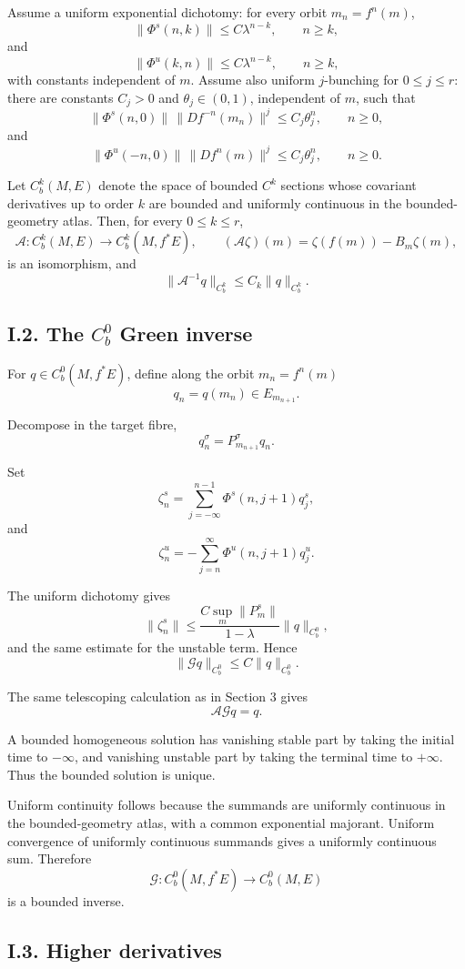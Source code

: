 \documentclass[12pt,a4paper]{article}
\theoremstyle{plain}
\numberwithin{equation}{section}
\numberwithin{theorem}{section}
\begin{document}
Assume a uniform exponential dichotomy: for every orbit $m_n=f^n(m)$,
\[
\|\Phi^s(n,k)\|\le C\lambda^{n-k},
\qquad n\ge k,
\]
and
\[
\|\Phi^u(k,n)\|\le C\lambda^{n-k},
\qquad n\ge k,
\]
with constants independent of $m$. Assume also uniform $j$-bunching for $0\le j\le r$: there are constants $C_j>0$ and $\theta_j\in(0,1)$, independent of $m$, such that
\[
\|\Phi^s(n,0)\|\,\|Df^{-n}(m_n)\|^j
\le C_j\theta_j^n,
\qquad n\ge0,
\]
and
\[
\|\Phi^u(-n,0)\|\,\|Df^n(m)\|^j
\le C_j\theta_j^n,
\qquad n\ge0.
\]

Let $C_b^k(M,E)$ denote the space of bounded $C^k$ sections whose covariant derivatives up to order $k$ are bounded and uniformly continuous in the bounded-geometry atlas. Then, for every $0\le k\le r$,
\[
\mathcal A:C_b^k(M,E)\to C_b^k(M,f^*E),
\qquad
(\mathcal A\zeta)(m)=\zeta(f(m))-B_m\zeta(m),
\]
is an isomorphism, and
\[
\|\mathcal A^{-1}q\|_{C_b^k}
\le C_k\|q\|_{C_b^k}.
\]

\subsection{I.2. The $C_b^0$ Green inverse}

For $q\in C_b^0(M,f^*E)$, define along the orbit $m_n=f^n(m)$
\[
q_n=q(m_n)\in E_{m_{n+1}}.
\]

Decompose in the target fibre,
\[
q_n^\sigma=P_{m_{n+1}}^\sigma q_n.
\]

Set
\[
\zeta_n^s
=
\sum_{j=-\infty}^{n-1}\Phi^s(n,j+1)q_j^s,
\]
and
\[
\zeta_n^u
=
-
\sum_{j=n}^{\infty}\Phi^u(n,j+1)q_j^u.
\]

The uniform dichotomy gives
\[
\|\zeta_n^s\|
\le
\frac{C\sup_m\|P_m^s\|}{1-\lambda}
\|q\|_{C_b^0},
\]
and the same estimate for the unstable term. Hence
\[
\|\mathcal Gq\|_{C_b^0}
\le C\|q\|_{C_b^0}.
\]

The same telescoping calculation as in Section 3 gives
\[
\mathcal A\mathcal Gq=q.
\]

A bounded homogeneous solution has vanishing stable part by taking the initial time to $-\infty$, and vanishing unstable part by taking the terminal time to $+\infty$. Thus the bounded solution is unique.

Uniform continuity follows because the summands are uniformly continuous in the bounded-geometry atlas, with a common exponential majorant. Uniform convergence of uniformly continuous summands gives a uniformly continuous sum. Therefore
\[
\mathcal G:C_b^0(M,f^*E)
\to
C_b^0(M,E)
\]
is a bounded inverse.

\subsection{I.3. Higher derivatives}
\end{document}
